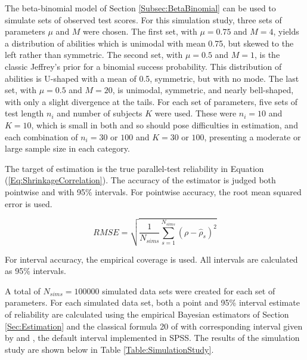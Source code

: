\documentclass[12pt,epsfig]{article}
\begin{document}
The beta-binomial model of Section \ref{Subsec:BetaBinomial} can be used to simulate sets of observed test scores. For this simulation study, three sets of parameters $\mu$ and $M$ were chosen. The first set, with $\mu = 0.75$ and $M = 4$, yields a distribution of abilities which is unimodal with mean 0.75, but skewed to the left rather than symmetric. The second set, with $\mu = 0.5$ and $M = 1$, is the classic Jeffrey's prior for a binomial success probability. This distribution of abilities is U-shaped with a mean of 0.5, symmetric, but with no mode. The last set, with $\mu = 0.5$ and $M = 20$, is unimodal, symmetric, and nearly bell-shaped, with only a slight divergence at the tails. For each set of parameters, five sets of test length $n_i$ and number of subjects $K$ were used. These were $n_i = 10$ and $K = 10$, which is small in both and so should pose difficulties in estimation, and each combination of $n_i = 30$ or $100$ and $K = 30$ or $100$, presenting a moderate or large sample size in each category.

The target of estimation is the true parallel-test reliability in Equation (\ref{Eq:ShrinkageCorrelation}). The accuracy of the estimator is judged both pointwise and with 95\% intervals. For pointwise accuracy, the root mean squared error is used.

\begin{equation*}
    RMSE = \sqrt{\dfrac{1}{N_{sims}} \displaystyle \sum_{s = 1}^{N_{sims}} (\rho - \hat{\rho}_{s})^2}
\end{equation*}

\noindent For interval accuracy, the empirical coverage is used. All intervals are calculated as 95\% intervals.

A total of $N_{sims} = 100000$ simulated data sets were created for each set of parameters. For each simulated data set, both a point and 95\% interval estimate of reliability are calculated using the empirical Bayesian estimators of Section \ref{Sec:Estimation} and the classical formula 20 of \cite{Kuder1937} with corresponding interval given by \cite{Feldt1965} and \cite{Feldt1987}, the default interval implemented in SPSS. The results of the simulation study are shown below in Table \ref{Table:SimulationStudy}. 
\end{document}
